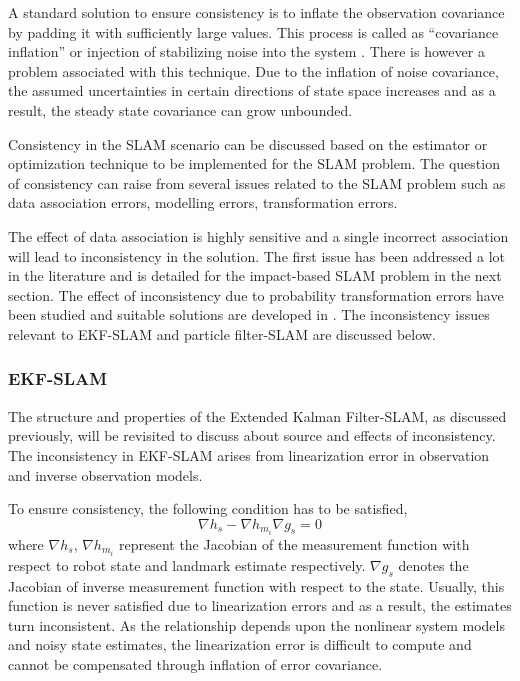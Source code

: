 A standard solution to ensure consistency is to inflate the observation covariance by padding it with sufficiently large values. This process is called as ``covariance inflation'' or injection of stabilizing noise into the system \cite{julier2003stability}. There is however a problem associated with this technique. Due to the inflation of noise covariance, the assumed uncertainties in certain directions of state space increases and as a result, the steady state covariance can grow unbounded.

Consistency in the SLAM scenario can be discussed based on the estimator or optimization technique to be implemented for the SLAM problem. The question of consistency can raise from several issues related to the SLAM problem such as data association errors, modelling errors, transformation errors.

The effect of data association is highly sensitive and a single incorrect association will lead to inconsistency in the solution. The first issue has been addressed a lot in the literature \cite{cooper2005comparison} and is detailed for the impact-based SLAM problem in the next section. The effect of inconsistency due to probability transformation errors have been studied and suitable solutions are developed in \cite{julier2004unscented}. The inconsistency issues relevant to EKF-SLAM and particle filter-SLAM are discussed below.

\subsubsection{EKF-SLAM}
The structure and properties of the Extended Kalman Filter-SLAM, as discussed previously, will be revisited to discuss about source and effects of inconsistency. The inconsistency in EKF-SLAM arises from linearization error in observation and inverse observation models.

To ensure consistency, the following condition \cite{julier2001counter} has to be satisfied,
\begin{equation}
\nabla h_s - \nabla h_{m_i}\nabla g_s = 0
\end{equation}
where $\nabla h_s$, $\nabla h_{m_i}$ represent the Jacobian of the measurement function with respect to robot state and landmark estimate respectively. $\nabla g_s$ denotes the Jacobian of inverse measurement function with respect to the state. Usually, this function is never satisfied due to linearization errors and as a result, the estimates turn inconsistent. As the relationship depends upon the nonlinear system models and noisy state estimates, the linearization error is difficult to compute and cannot be compensated through inflation of error covariance. 

